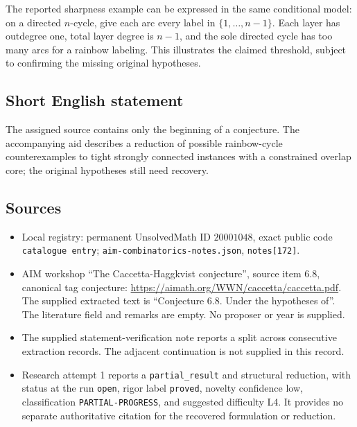 \documentclass[11pt]{article}
\begin{document}
The reported sharpness example can be expressed in the same conditional model: on a directed \(n\)-cycle, give each arc every label in \(\{1,\ldots,n-1\}\). Each layer has outdegree one, total layer degree is \(n-1\), and the sole directed cycle has too many arcs for a rainbow labeling. This illustrates the claimed threshold, subject to confirming the missing original hypotheses.
\subsection{Short English statement}
The assigned source contains only the beginning of a conjecture. The accompanying aid describes a reduction of possible rainbow-cycle counterexamples to tight strongly connected instances with a constrained overlap core; the original hypotheses still need recovery.
\subsection{Sources}
\begin{itemize}
\item Local registry: permanent UnsolvedMath ID \(20001048\), exact public code \texttt{catalogue entry}; \texttt{aim-combinatorics-notes.json}, \texttt{notes[172]}.
\item AIM workshop ``The Caccetta-Haggkvist conjecture'', source item 6.8, canonical tag conjecture: \url{https://aimath.org/WWN/caccetta/caccetta.pdf}. The supplied extracted text is ``Conjecture 6.8. Under the hypotheses of''. The literature field and remarks are empty. No proposer or year is supplied.
\item The supplied statement-verification note reports a split across consecutive extraction records. The adjacent continuation is not supplied in this record.
\item Research attempt 1 reports a \texttt{partial\_result} and structural reduction, with status at the run \texttt{open}, rigor label \texttt{proved}, novelty confidence low, classification \texttt{PARTIAL-PROGRESS}, and suggested difficulty L4. It provides no separate authoritative citation for the recovered formulation or reduction.
\end{itemize}
\end{document}
